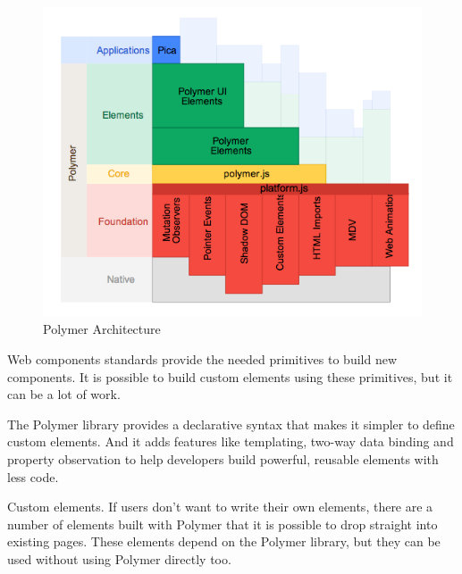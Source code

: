 \begin {figure}[h]
\graphicspath{{images/chapter_TCH/}}
\includegraphics[width=\textwidth]{polymer_1}
\caption{Polymer Architecture}
\end {figure}
 

Web components standards provide the needed primitives to build new components. It is possible to build custom elements using these primitives, but it can be a lot of work.

The Polymer library provides a declarative syntax that makes it simpler to define custom elements. And it adds features like templating, two-way data binding and property observation to help developers build powerful, reusable elements with less code.

Custom elements. If users don’t want to write their own elements, there are a number of elements built with Polymer that it is possible to drop straight into existing pages. These elements depend on the Polymer library, but they can be used without using Polymer directly too.\cite{tch_polymer1}



